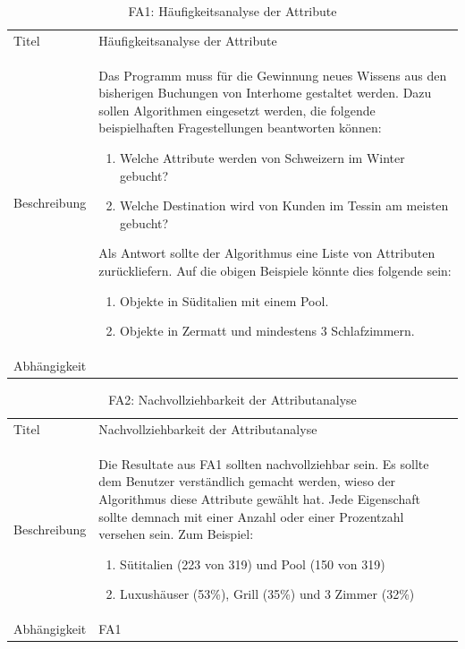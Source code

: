 \begin{table}[H] 
	\caption{FA1: Häufigkeitsanalyse der Attribute}
	\centering
	\label{fig:anforderungsanalyse:funktionaleanforderung:fa1}
	\begin{tabular}{ | l | L{10cm} | } 
		\hline 
		 \\ \hline 
		Titel & Häufigkeitsanalyse der Attribute \\ \hline 
		Beschreibung & Das Programm muss für die Gewinnung neues Wissens aus den bisherigen Buchungen von Interhome gestaltet werden. Dazu sollen Algorithmen eingesetzt werden, die folgende beispielhaften Fragestellungen beantworten können:
		\begin{enumerate}
		\item Welche Attribute werden von Schweizern im Winter gebucht?
		\item Welche Destination wird von Kunden im Tessin am meisten gebucht?
		\end{enumerate}
		
		Als Antwort sollte der Algorithmus eine Liste von Attributen zurückliefern. Auf die obigen Beispiele könnte dies folgende sein: 
		\begin{enumerate}
		\item Objekte in Süditalien mit einem Pool.
		\item Objekte in Zermatt und mindestens 3 Schlafzimmern.
		\end{enumerate} \\ \hline 
		Abhängigkeit & \\ \hline 
	\end{tabular}
\end{table}

\begin{table}[H] 
	\caption{FA2: Nachvollziehbarkeit der Attributanalyse}
	\centering
	\label{fig:anforderungsanalyse:funktionaleanforderung:fa2}
	\begin{tabular}{ | l | L{10cm} | } 
		\hline 
		 \\ \hline 
		Titel & Nachvollziehbarkeit der Attributanalyse \\ \hline 
		Beschreibung & Die Resultate aus FA1 sollten nachvollziehbar sein. Es sollte dem Benutzer verständlich gemacht werden, wieso der Algorithmus diese Attribute gewählt hat. Jede Eigenschaft sollte demnach mit einer Anzahl oder einer Prozentzahl versehen sein. Zum Beispiel:
			\begin{enumerate}
			\item Sütitalien (223 von 319) und Pool (150 von 319)
			\item Luxushäuser (53\%), Grill (35\%) und 3 Zimmer (32\%)
			\end{enumerate} \\ \hline 
		Abhängigkeit & FA1 \\ \hline 
	\end{tabular}
\end{table}

